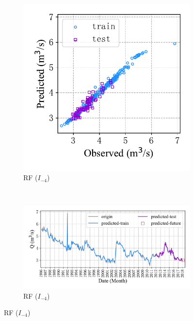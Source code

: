 \begin{figure}[!htbp]
\begin{subfigure}[b]{0.615\textwidth}
  \end{subfigure}
  \\
  \begin{subfigure}[b]{0.305\textwidth}
    \includegraphics[width=\textwidth]{Img/chap4_spr/out1/spr_scatter_in_4_out_1_rf.pdf}
    \vspace{-1.2cm}
    \caption{RF ($I_{-4}$)}
    \label{fig:spr_scatter_in_4_out_1_rf}
  \end{subfigure}
  ~
  \begin{subfigure}[b]{0.615\textwidth}
    \includegraphics[width=\textwidth]{Img/chap4_spr/out1/spr_series_in_4_out_1_rf.pdf}
    \vspace{-1.2cm}
    \caption{RF ($I_{-4}$)}
    \label{fig:spr_series_in_4_out_1_rf}
  \end{subfigure}
  \label{fig:spr_out_1}
\end{figure}

